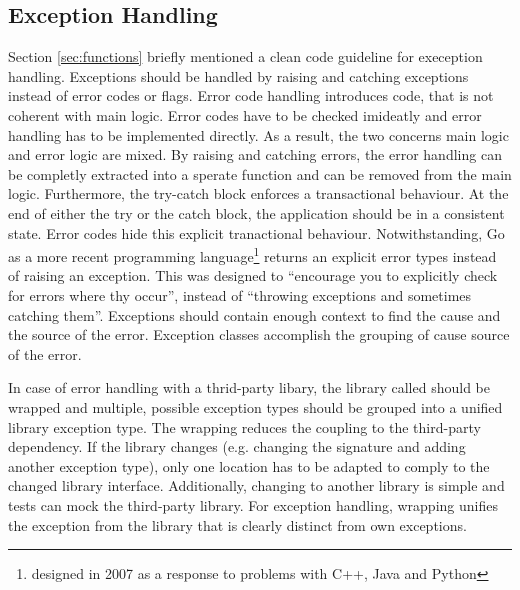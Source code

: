 \subsection{Exception Handling}\label{sec:background:returning_none_and_error_handling}
Section \ref{sec:functions} briefly mentioned a clean code guideline for exeception handling. Exceptions should be handled by raising and catching exceptions instead of error codes or flags. Error code handling introduces code, that is not coherent with main logic. Error codes have to be checked imideatly and error handling has to be implemented directly. As a result, the two concerns main logic and error logic are mixed. By raising and catching errors, the error handling can be completly extracted into a sperate function and can be removed from the main logic. Furthermore, the try-catch block enforces a transactional behaviour. At the end of either the try or the catch block, the application should be in a consistent state. Error codes hide this explicit tranactional behaviour. Notwithstanding, Go as a more recent programming language\footnote{designed in 2007 as a response to problems with C++, Java and Python\cite{noauthor_go_nodate}} returns an explicit error types instead of raising an exception. This was designed to \enquote{encourage you to explicitly check for errors where thy occur}, instead of \enquote{throwing exceptions and sometimes catching them}\cite{gerrand_error_2011}.   
Exceptions should contain enough context to find the cause and the source of the error. Exception classes accomplish the grouping of cause source of the error. 

In case of error handling with a thrid-party libary, the library called should be wrapped and multiple, possible exception types should be grouped into a unified library exception type. The wrapping reduces the coupling to the third-party dependency. If the library changes (e.g. changing the signature and adding another exception type), only one location has to be adapted to comply to the changed library interface. Additionally, changing to another library is simple and tests can mock the third-party library. For exception handling, wrapping unifies the exception from the library that is clearly distinct from own exceptions.

